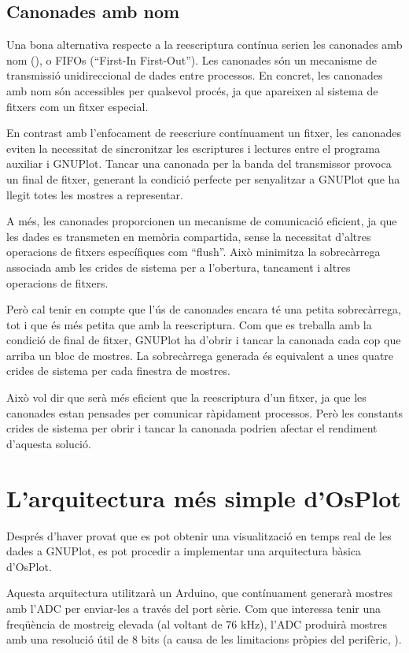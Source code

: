 \documentclass{tfgitic}[2023/06/30]
\begin{document}
\subsection{Canonades amb nom}

Una bona alternativa respecte a la reescriptura contínua serien les
canonades amb nom (\cite[``Named Pipes'']{canonades-nom}), o FIFOs
(``First-In First-Out''). Les canonades són un mecanisme de
transmissió unidireccional de dades entre processos. En concret, les
canonades amb nom són accessibles per qualsevol procés, ja que
apareixen al sistema de fitxers com un fitxer especial.

En contrast amb l'enfocament de reescriure contínuament un fitxer, les
canonades eviten la necessitat de sincronitzar les escriptures i
lectures entre el programa auxiliar i GNUPlot. Tancar una canonada per
la banda del transmissor provoca un final de fitxer, generant la
condició perfecte per senyalitzar a GNUPlot que ha llegit totes les
mostres a representar.

A més, les canonades proporcionen un mecanisme de comunicació
eficient, ja que les dades es transmeten en memòria compartida, sense
la necessitat d'altres operacions de fitxers específiques com
``flush''. Això minimitza la sobrecàrrega associada amb les crides de
sistema per a l'obertura, tancament i altres operacions de fitxers.

Però cal tenir en compte que l'ús de canonades encara té una petita
sobrecàrrega, tot i que és més petita que amb la reescriptura. Com
que es treballa amb la condició de final de fitxer, GNUPlot ha d'obrir
i tancar la canonada cada cop que arriba un bloc de mostres. La
sobrecàrrega generada és equivalent a unes quatre crides de sistema
per cada finestra de mostres.

Això vol dir que serà més eficient que la reescriptura d'un fitxer, ja
que les canonades estan pensades per comunicar ràpidament
processos. Però les constants crides de sistema per obrir i tancar la
canonada podrien afectar el rendiment d'aquesta solució.

\section{L'arquitectura més simple d'OsPlot}

Després d'haver provat que es pot obtenir una visualització en temps
real de les dades a GNUPlot, es pot procedir a implementar una
arquitectura bàsica d'OsPlot.

Aquesta arquitectura utilitzarà un Arduino, que contínuament generarà
mostres amb l'ADC per enviar-les a través del port sèrie. Com que
interessa tenir una freqüència de mostreig elevada (al voltant de 76
kHz), l'ADC produirà mostres amb una resolució útil de 8 bits (a causa
de les limitacions pròpies del perifèric, \cite{analisi-adc}).
\end{document}
